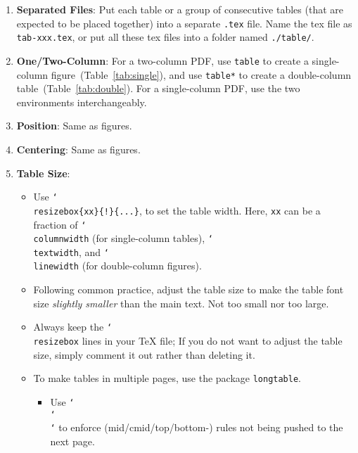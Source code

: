 \begin{enumerate}
  \item \textbf{Separated Files}:
    Put each table or a group of consecutive tables (that are expected to be placed together) into a separate \texttt{.tex} file.
    Name the tex file as \texttt{tab-xxx.tex}, or put all these tex files into a folder named \texttt{./table/}.

  \item \textbf{One/Two-Column}:
    For a two-column PDF, use \texttt{table} to create a single-column figure~(Table~\ref{tab:single}), and use \texttt{table*} to create a double-column table~(Table~\ref{tab:double}).
    For a single-column PDF, use the two environments interchangeably.

  \item \textbf{Position}:
    Same as figures.

  \item \textbf{Centering}:
    Same as figures.

  \item \textbf{Table Size}:
  \begin{itemize}
    \item
      Use \texttt{\char`\\resizebox\{xx\}\{!\}\{...\}}, to set the table width.
      Here, \texttt{xx} can be a fraction of \texttt{\char`\\columnwidth} (for single-column tables), \texttt{\char`\\textwidth}, and \texttt{\char`\\linewidth} (for double-column figures).
    \item
      Following common practice, adjust the table size to make the table font size \textit{slightly smaller} than the main text.
      Not too small nor too large.
    \item
      Always keep the \texttt{\char`\\resizebox} lines in your TeX file; If you do not want to adjust the table size, simply comment it out rather than deleting it.
      
    \item To make tables in multiple pages, use the package \texttt{longtable}.
    \begin{itemize}
      \item  Use \texttt{\char`\\\char`\\\char`\*} to enforce (mid/cmid/top/bottom-) rules not being pushed to the next page.
    \end{itemize}


\end{itemize}
\end{enumerate}
